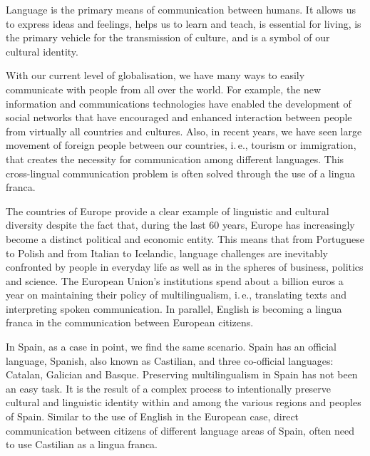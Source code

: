 \begin{multicols}{2}
    
Language is the primary means of communication between humans. It allows us to express ideas and feelings, helps us to learn and teach, is essential for living, is the primary vehicle for the transmission of culture, and is a symbol of our cultural identity.


With our current level of globalisation, we have many ways to easily communicate with people from all over the world. For example, the new information and communications technologies have enabled the development of social networks that have encouraged and enhanced   interaction between people from virtually all countries and cultures. Also, in recent years, we have seen large movement of foreign people between our countries, i.\,e., tourism or immigration, that creates the necessity for communication among different languages. This cross-lingual communication problem is often solved through the use of a lingua franca.

The countries of Europe provide a clear example of linguistic and cultural diversity despite the fact that, during the last 60 years, Europe has increasingly become a distinct political and economic entity. This means that from Portuguese to Polish and from Italian to Icelandic, language challenges are inevitably confronted by people in everyday life as well as in the spheres of business, politics and science. The European Union’s institutions spend about a billion euros a year on maintaining their policy of multilingualism, i.\,e., translating texts and interpreting spoken communication. In parallel, English is becoming a lingua franca in the communication between European citizens.

In Spain, as a case in point, we find the same scenario. Spain has an official language, Spanish, also known as Castilian, and three co-official languages: Catalan, Galician and Basque. Preserving multilingualism in Spain has not been an easy task. It is the result of a complex process to intentionally preserve cultural and linguistic identity within and among the various regions and peoples of Spain. Similar to the use of English in the European case, direct communication between citizens of different language areas of Spain, often need to use Castilian as a lingua franca.



\end{multicols}
